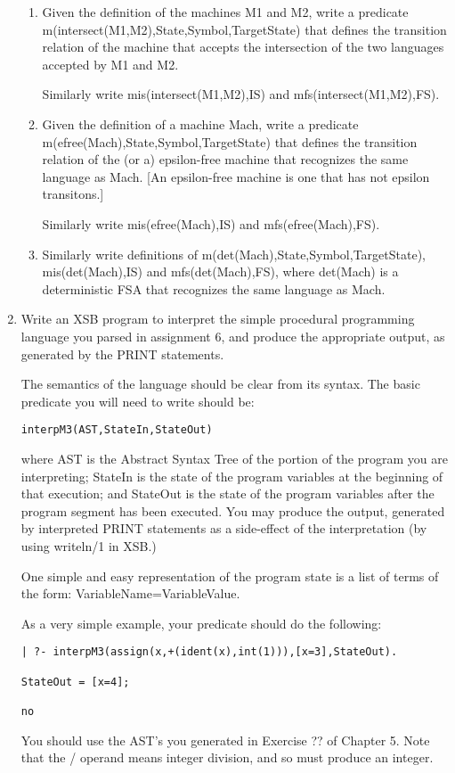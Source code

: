 \begin{enumerate}
\begin{enumerate}
\item
Given the definition of the machines M1 and M2, write a predicate
m(intersect(M1,M2),State,Symbol,TargetState) that defines the
transition relation of the machine that accepts the intersection of
the two languages accepted by M1 and M2.

Similarly write mis(intersect(M1,M2),IS) and mfs(intersect(M1,M2),FS).

\item
Given the definition of a machine Mach, write a predicate
m(efree(Mach),State,Symbol,TargetState) that defines the transition
relation of the (or a) epsilon-free machine that recognizes the same
language as Mach.  [An epsilon-free machine is one that has not
epsilon transitons.]  

Similarly write mis(efree(Mach),IS) and mfs(efree(Mach),FS).

\item
Similarly write definitions of m(det(Mach),State,Symbol,TargetState),
mis(det(Mach),IS) and mfs(det(Mach),FS), where det(Mach) is a
deterministic FSA that recognizes the same language as Mach.


\end{enumerate}

\item
Write an XSB program to interpret the
simple procedural programming language you parsed in assignment 6, and
produce the appropriate output, as generated by the PRINT statements.

The semantics of the language should be clear from its syntax.  The
basic predicate you will need to write should be:
\begin{verbatim}
interpM3(AST,StateIn,StateOut)
\end{verbatim}

where AST is the Abstract Syntax Tree of the portion of the program
you are interpreting; StateIn is the state of the program variables at
the beginning of that execution; and StateOut is the state of the
program variables after the program segment has been executed.  You
may produce the output, generated by interpreted PRINT statements as a
side-effect of the interpretation (by using writeln/1 in XSB.)

One simple and easy representation of the program state is a list of
terms of the form: VariableName=VariableValue.

As a very simple example, your predicate should do the following:
\begin{verbatim}
| ?- interpM3(assign(x,+(ident(x),int(1))),[x=3],StateOut).

StateOut = [x=4];

no
\end{verbatim}

You should use the AST's you generated in Exercise ?? of Chapter 5.
Note that the / operand means integer division, and so must produce an
integer.

\end{enumerate}
